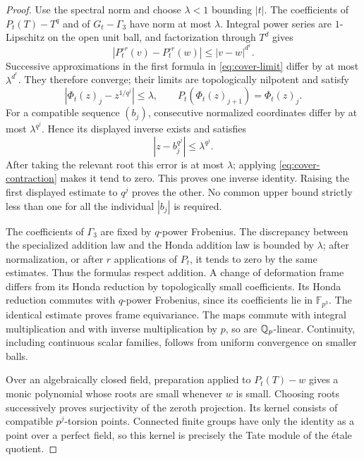\begin{proof}
Use the spectral norm and choose $\lambda<1$ bounding $|t|$.
The coefficients of $P_t(T)-T^q$ and of $G_t-\Gamma_3$ have norm at
most $\lambda$.  Integral power series are $1$-Lipschitz on the open
unit ball, and factorization through $T^d$ gives
\begin{equation}
 |P_t^{\circ r}(v)-P_t^{\circ r}(w)|
       \leq |v-w|^{d^r}.
 \label{eq:cover-contraction}
\end{equation}
Successive approximations in the first formula in
\eqref{eq:cover-limit} differ by at most $\lambda^{d^r}$.
They therefore converge; their limits are topologically nilpotent and
satisfy
\[
 |\Phi_t(z)_j-z^{1/q^j}|\leq\lambda,
 \qquad P_t(\Phi_t(z)_{j+1})=\Phi_t(z)_j.
\]
For a compatible sequence $(b_j)$, consecutive normalized coordinates
differ by at most $\lambda^{q^j}$.  Hence its displayed inverse exists
and satisfies
\[
 |z-b_j^{q^j}|\leq\lambda^{q^j}.
\]
After taking the relevant root this error is at most $\lambda$;
applying \eqref{eq:cover-contraction} makes it tend to zero.
This proves one inverse identity.  Raising the first displayed
estimate to $q^j$ proves the other.  No common upper bound strictly
less than one for all the individual $|b_j|$ is required.

The coefficients of $\Gamma_3$ are fixed by $q$-power Frobenius.
The discrepancy between the specialized addition law and the Honda
addition law is bounded by $\lambda$; after normalization, or after
$r$ applications of $P_t$, it tends to zero by the same estimates.
Thus the formulas respect addition.  A change of deformation frame
differs from its Honda reduction by topologically small coefficients.
Its Honda reduction commutes with $q$-power Frobenius, since its
coefficients lie in $\mathbb F_{p^3}$.  The identical estimate proves
frame equivariance.  The maps commute with integral multiplication
and with inverse multiplication by $p$, so are $\mathbb Q_p$-linear.
Continuity, including continuous scalar families, follows from uniform
convergence on smaller balls.

Over an algebraically closed field, preparation applied to
$P_t(T)-w$ gives a monic polynomial whose roots are small whenever
$w$ is small.  Choosing roots successively proves surjectivity of the
zeroth projection.  Its kernel consists of compatible $p^j$-torsion
points.  Connected finite groups have only the identity as a point
over a perfect field, so this kernel is precisely the Tate module of
the étale quotient.
\end{proof}

